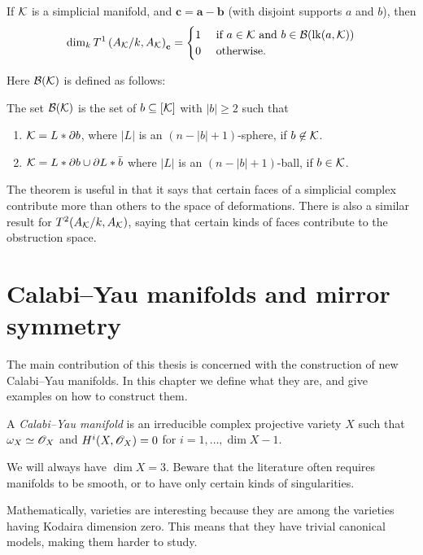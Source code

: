 \begin{theorem}
\label{thm:t1dims}
If $\mathcal{K}$ is a simplicial manifold, and $\mathbf c = \mathbf a - \mathbf b$ (with disjoint supports $a$ and $b$), then
$$
\dim_k T^1\left(A_{\mathcal{K}}/k,A_{\mathcal{K}} \right)_{\mathbf c} = \begin{cases}
1 & \text{ if } a  \in \mathcal{K} \text{ and } b \in \mathcal B(\mathrm{lk}(a,\mathcal{K})) \\
0 & \text{ otherwise.}
\end{cases}
$$
\end{theorem}
Here $\mathcal B(\mathcal{K})$ is defined as follows:
\begin{definition}
The set $\mathcal B(\mathcal{K})$ is the set of $b \subseteq [\mathcal{K}]$ with $|b| \geq 2$ such that
\begin{enumerate}
	\item $\mathcal{K} = L \ast \partial b$, where $|L|$ is an $(n-|b|+1)$-sphere, if $b \not \in \mathcal{K}$.
	\item $\mathcal{K} = L \ast \partial b \cup \partial L \ast \bar{b}$ where $|L|$ is an $(n-|b|+1)$-ball, if $b \in \mathcal{K}$.
\end{enumerate}
\end{definition}

The theorem is useful in that it says that certain faces of a simplicial complex contribute more than others to the space of deformations. There is also a similar result for $T^2(A_{\mathcal{K}}/k,A_{\mathcal{K}})$, saying that certain kinds of faces contribute to the obstruction space.

\section{Calabi--Yau manifolds and mirror symmetry}
\label{sec:calabi_yau}

The main contribution of this thesis is concerned with the construction of new Calabi--Yau manifolds. In this chapter we define what they are, and give examples on how to construct them.

\begin{definition}
A \emph{Calabi--Yau manifold} is an irreducible complex projective variety $X$ such that $\omega_X \simeq \mathscr{O}_X$ and $H^i(X,\mathscr{O}_X)=0$ for $i=1,\ldots,\dim X-1$.
\end{definition}

We will always have $\dim X=3$. Beware that the literature often requires \CY manifolds to be smooth, or to have only certain kinds of singularities.

Mathematically, \CY varieties are interesting because they are among the varieties having Kodaira dimension zero. This means that they have trivial canonical models, making them harder to study.

